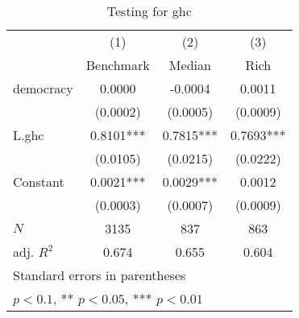 \begin{table}[htbp]\centering
\def\sym#1{\ifmmode^{#1}\else\(^{#1}\)\fi}
\caption{Testing for ghc \label{tab:regression3}}
\begin{tabular}{l*{3}{c}}
\hline\hline
            &\multicolumn{1}{c}{(1)}&\multicolumn{1}{c}{(2)}&\multicolumn{1}{c}{(3)}\\
            &\multicolumn{1}{c}{Benchmark}&\multicolumn{1}{c}{Median}&\multicolumn{1}{c}{Rich}\\
\hline
democracy   &      0.0000   &     -0.0004   &      0.0011   \\
            &    (0.0002)   &    (0.0005)   &    (0.0009)   \\
[1em]
L.ghc       &      0.8101***&      0.7815***&      0.7693***\\
            &    (0.0105)   &    (0.0215)   &    (0.0222)   \\
[1em]
Constant    &      0.0021***&      0.0029***&      0.0012   \\
            &    (0.0003)   &    (0.0007)   &    (0.0009)   \\
\hline
\(N\)       &        3135   &         837   &         863   \\
adj. \(R^{2}\)&       0.674   &       0.655   &       0.604   \\
\hline\hline
\multicolumn{4}{l}{\footnotesize Standard errors in parentheses}\\
\multicolumn{4}{l}{\footnotesize * \(p<0.1\), ** \(p<0.05\), *** \(p<0.01\)}\\
\end{tabular}
\end{table}
